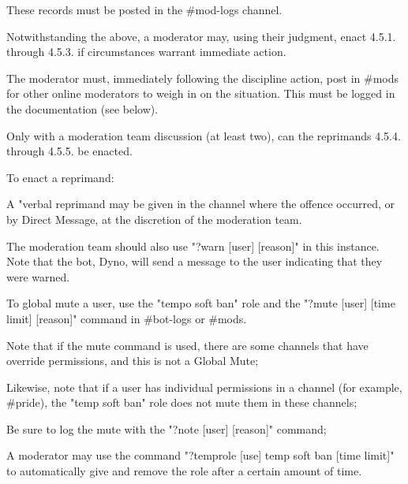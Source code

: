 \begin{longenum}[ label*=\thesubsection.\arabic*., align=left]
\begin{longenum}[label*=\arabic*., align=left]
\begin{longenum}[label*=\arabic*., align=left]
				\begin{longenum}[label*=\arabic*., align=left]
				\item These records must be posted in the \#mod-logs channel.
				\end{longenum}	
			\end{longenum}	
		\item Notwithstanding the above, a moderator may, using their judgment, enact 4.5.1. through 4.5.3. if circumstances warrant immediate action.
			\begin{longenum}[label*=\arabic*., align=left]
			\item The moderator must, immediately following the discipline action, post in \#mods for other online moderators to weigh in on the situation. This must be logged in the documentation (see below).
			\item Only with a moderation team discussion (at least two), can the reprimands 4.5.4. through 4.5.5. be enacted.
			\end{longenum}	
		\item To enact a reprimand:
			\begin{longenum}[label*=\arabic*., align=left]
			\item A "verbal reprimand may be given in the channel where the offence occurred, or by Direct Message, at the discretion of the moderation team.
				\begin{longenum}[label*=\arabic*., align=left]
				\item The moderation team should also use "?warn [user] [reason]" in this instance. Note that the bot, Dyno, will send a message to the user indicating that they were warned.
				\end{longenum}	
			\item To global mute a user, use the "tempo soft ban" role and the "?mute [user] [time limit] [reason]" command in \#bot-logs or \#mods.
				\begin{longenum}[label*=\arabic*., align=left]
				\item Note that if the mute command is used, there are some channels that have override permissions, and this is not a Global Mute;
				\item Likewise, note that if a user has individual permissions in a channel (for example, \#pride), the "temp soft ban" role does not mute them in these channels;
				\item Be sure to log the mute with the "?note [user] [reason]" command;
				\item A moderator may use the command "?temprole [use] temp soft ban [time limit]" to automatically give and remove the role after a certain amount of time.

\end{longenum}
\end{longenum}
\end{longenum}
\end{longenum}
